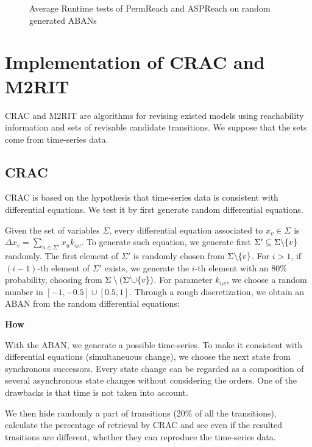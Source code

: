 \begin{figure}[ht]
    \caption[Runtime tests of reachability analyzers]{Average Runtime tests of PermReach and ASPReach on random generated ABANs}
\end{figure}

\section{Implementation of CRAC and M2RIT}
CRAC and M2RIT are algorithms for revising existed models using reachability information and sets of revisable candidate transitions.
We suppose that the sets come from time-series data.

\subsection{CRAC}
CRAC is based on the hypothesis that time-series data is consistent with differential equations.
We test it by first generate random differential equations.

Given the set of variables $\Sigma$, every differential equation associated to $x_v\in \Sigma$ is $\Delta x_v=\sum_{u\in \Sigma'}x_u k_{uv}$. 
To generate such equation, we generate first $\Sigma'\subseteq \Sigma\miset{v}$ randomly.
The first element of $\Sigma'$ is randomly chosen from $\Sigma\miset{v}$.
For $i>1$, if $(i-1)$-th element of $\Sigma'$ exists, we generate the $i$-th element with an 80\% probability, choosing from $\Sigma\setminus(\Sigma'\addset{v})$.
For parameter $k_{uv}$, we choose a random number in $[-1,-0.5]\cup[0.5,1]$.
Through a rough discretization, we obtain an ABAN from the random differential equations:

\textbf{How}

With the ABAN, we generate a possible time-series.
To make it consistent with differential equations (simultaneuous change), we choose the next state from synchronous successors.
Every state change can be regarded as a composition of several asynchronous state changes without considering the orders.
One of the drawbacks is that time is not taken into account.

We then hide randomly a part of transitions (20\% of all the transitions), calculate the percentage of retrieval by CRAC and see even if the resulted trasitions are different, whether they can reproduce the time-series data.

